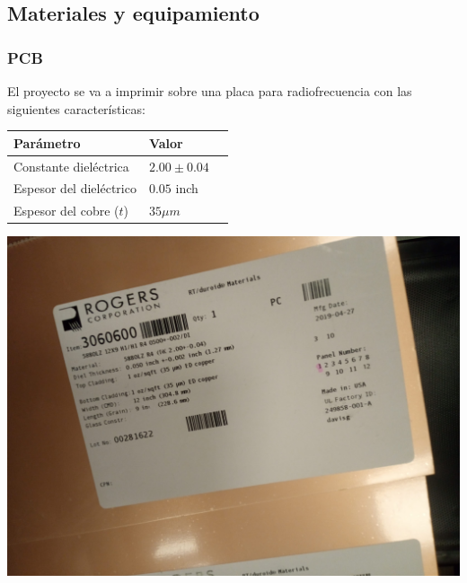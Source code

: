 \documentclass[a4paper, 12pt]{article}
\begin{document}
\subsection*{Materiales y equipamiento}

\subsubsection*{PCB}
\begin{minipage}{0.66\linewidth}
  El proyecto se va a imprimir sobre una placa para radiofrecuencia \cite{RT-DUROID}con las siguientes características:
  \begin{tabular}{|l|l|l|}
  \hline
  Parámetro & Valor & \\ \hline
  Constante dieléctrica & $2.00 \pm 0.04$ & \\ \hline
  Espesor del dieléctrico & $0.05$ inch & \\ \hline
  Espesor del cobre ($t$) & $35 \mu m$ & \\ \hline
  \end{tabular}
\end{minipage}
\begin{minipage}{0.32\linewidth}
  \includegraphics[width=\linewidth]{./img/sustrato.jpg}
\end{minipage}
\end{document}
